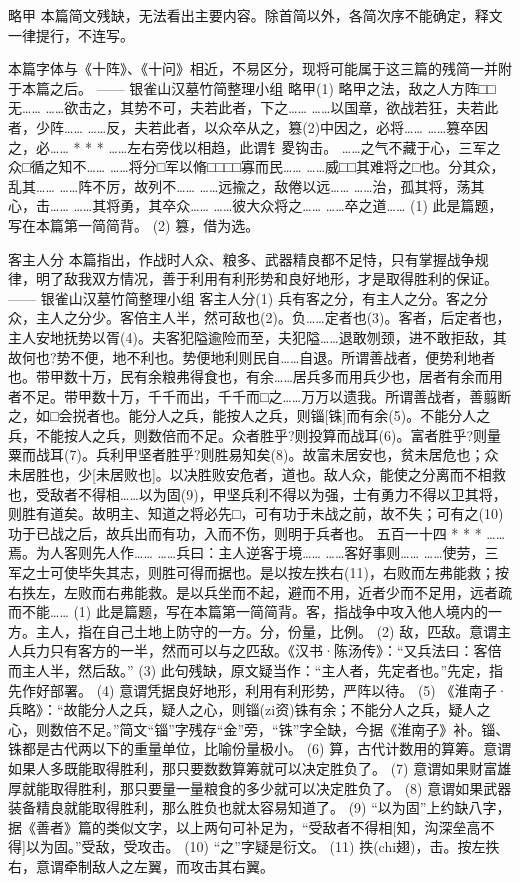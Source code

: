 \documentclass[12pt,UTF8]{ctexbook}
\begin{document}
略甲
本篇简文残缺，无法看出主要内容。除首简以外，各简次序不能确定，释文一律提行，不连写。

本篇字体与《十阵》、《十问》相近，不易区分，现将可能属于这三篇的残简一并附于本篇之后。
—— 银雀山汉墓竹简整理小组
略甲(1)
略甲之法，敌之人方阵□□无……
……欲击之，其势不可，夫若此者，下之……
……以国章，欲战若狂，夫若此者，少阵……
……反，夫若此者，以众卒从之，篡(2)中因之，必将……
……篡卒因之，必……
* * *
……左右旁伐以相趋，此谓{钅畟}钩击。
……之气不藏于心，三军之众□循之知不……
……将分□军以脩□□□□寡而民……
……威□□其难将之□也。分其众，乱其……
……阵不厉，故列不……
……远揄之，敌倦以远……
……治，孤其将，荡其心，击……
……其将勇，其卒众……
……彼大众将之……
……卒之道……
(1) 此是篇题，写在本篇第一简简背。
(2) 篡，借为选。

客主人分
本篇指出，作战时人众、粮多、武器精良都不足恃，只有掌握战争规律，明了敌我双方情况，善于利用有利形势和良好地形，才是取得胜利的保证。
—— 银雀山汉墓竹简整理小组
客主人分(1)
兵有客之分，有主人之分。客之分众，主人之分少。客倍主人半，然可敌也(2)。负……定者也(3)。客者，后定者也，主人安地抚势以胥(4)。夫客犯隘逾险而至，夫犯隘……退敢刎颈，进不敢拒敌，其故何也?势不便，地不利也。势便地利则民自……自退。所谓善战者，便势利地者也。带甲数十万，民有余粮弗得食也，有余……居兵多而用兵少也，居者有余而用者不足。带甲数十万，千千而出，千千而□之……万万以遗我。所谓善战者，善翦断之，如□会捝者也。能分人之兵，能按人之兵，则锱[铢]而有余(5)。不能分人之兵，不能按人之兵，则数倍而不足。众者胜乎?则投算而战耳(6)。富者胜乎?则量粟而战耳(7)。兵利甲坚者胜乎?则胜易知矣(8)。故富未居安也，贫未居危也；众未居胜也，少[未居败也]。以决胜败安危者，道也。敌人众，能使之分离而不相救也，受敌者不得相……以为固(9)，甲坚兵利不得以为强，士有勇力不得以卫其将，则胜有道矣。故明主、知道之将必先□，可有功于未战之前，故不失；可有之(10)功于已战之后，故兵出而有功，入而不伤，则明于兵者也。
五百一十四
* * *
……焉。为人客则先人作……
……兵曰：主人逆客于境……
……客好事则……
……使劳，三军之士可使毕失其志，则胜可得而据也。是以按左抶右(11)，右败而左弗能救；按右抶左，左败而右弗能救。是以兵坐而不起，避而不用，近者少而不足用，远者疏而不能……
(1) 此是篇题，写在本篇第一简简背。客，指战争中攻入他人境内的一方。主人，指在自己土地上防守的一方。分，份量，比例。
(2) 敌，匹敌。意谓主人兵力只有客方的一半，然而可以与之匹敌。《汉书·陈汤传》：“又兵法曰：客倍而主人半，然后敌。”
(3) 此句残缺，原文疑当作：“主人者，先定者也。”先定，指先作好部署。
(4) 意谓凭据良好地形，利用有利形势，严阵以待。
(5) 《淮南子·兵略》：“故能分人之兵，疑人之心，则锱(zi资)铢有余；不能分人之兵，疑人之心，则数倍不足。”简文“锱”字残存“金”旁，“铢”字全缺，今据《淮南子》补。锱、铢都是古代两以下的重量单位，比喻份量极小。
(6) 算，古代计数用的算筹。意谓如果人多既能取得胜利，那只要数数算筹就可以决定胜负了。
(7) 意谓如果财富雄厚就能取得胜利，那只要量一量粮食的多少就可以决定胜负了。
(8) 意谓如果武器装备精良就能取得胜利，那么胜负也就太容易知道了。
(9) “以为固”上约缺八字，据《善者》篇的类似文字，以上两句可补足为，“受敌者不得相[知，沟深垒高不得]以为固。”受敌，受攻击。
(10) “之”字疑是衍文。
(11) 抶(chi翅)，击。按左抶右，意谓牵制敌人之左翼，而攻击其右翼。
\end{document}
